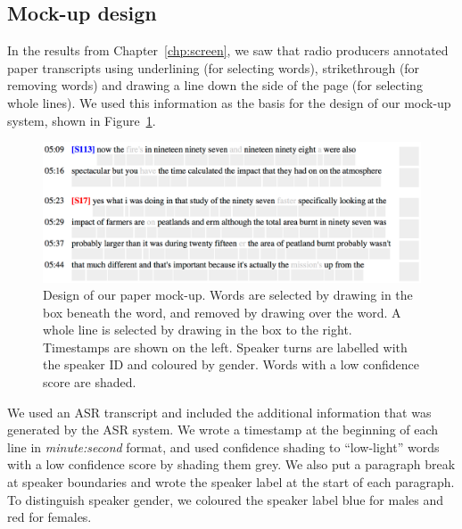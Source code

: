 
\subsection{Mock-up design}

In the results from Chapter~\ref{chp:screen}, we saw that radio producers annotated paper transcripts using underlining
(for selecting words), strikethrough (for removing words) and drawing a line down the side of the page (for selecting
whole lines).  We used this information as the basis for the design of our mock-up system, shown in
Figure~\ref{fig:paper-prototype-design}.

\begin{figure}[h]
  \centering
  \includegraphics[width=\columnwidth]{figs/paper-prototype-design}
  \caption[Design of our paper mock-up.]{Design of our paper mock-up.  Words are selected by drawing in the box beneath
  the word, and removed by drawing over the word. A whole line is selected by drawing in the box to the right.
Timestamps are shown on the left.  Speaker turns are labelled with the speaker ID and coloured by gender. Words with a
low confidence score are shaded.}
  \label{fig:paper-prototype-design}
\end{figure}

We used an ASR transcript and included the additional information that was generated by the ASR system.  We wrote a
timestamp at the beginning of each line in \textit{minute:second} format, and used confidence shading \citep{Vemuri2004}
to ``low-light'' words with a low confidence score by shading them grey. We also put a paragraph break at speaker
boundaries and wrote the speaker label at the start of each paragraph. To distinguish speaker gender, we coloured the
speaker label blue for males and red for females.

